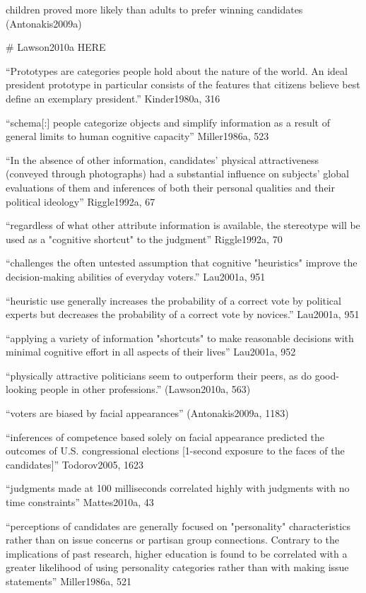 	children proved more likely than adults to prefer winning candidates (Antonakis2009a)

# Lawson2010a HERE

``Prototypes are categories people hold about the nature of the world. An ideal president prototype in particular consists of the features that citizens believe best define an exemplary president.'' Kinder1980a, 316

``schema[:] people categorize objects and simplify information as a result of general limits to human cognitive capacity'' Miller1986a, 523

``In the absence of other information, candidates' physical attractiveness (conveyed through photographs) had a substantial influence on subjects' global evaluations of them and inferences of both their personal qualities and their political ideology'' Riggle1992a, 67

``regardless of what other attribute information is available, the stereotype will be used as a "cognitive shortcut" to the judgment'' Riggle1992a, 70

``challenges the often untested assumption that cognitive "heuristics" improve the decision-making abilities of everyday voters.'' Lau2001a, 951

``heuristic use generally increases the probability of a correct vote by political experts but decreases the probability of a correct vote by novices.'' Lau2001a, 951

``applying a variety of information "shortcuts" to make reasonable decisions with minimal cognitive effort in all aspects of their lives'' Lau2001a, 952


``physically attractive politicians seem to outperform their peers, as do good-looking people in other professions.'' (Lawson2010a, 563)

``voters are biased by facial appearances'' (Antonakis2009a, 1183)


	
	``inferences of competence based solely on facial appearance predicted the outcomes of U.S. congressional elections [1-second exposure to the faces of the candidates]'' Todorov2005, 1623

	``judgments made at 100 milliseconds correlated highly with judgments with no time constraints'' Mattes2010a, 43

``perceptions of candidates are generally focused on "personality" characteristics rather than on issue concerns or partisan group connections. Contrary to the implications of past research, higher education is found to be correlated with a greater likelihood of using personality categories rather than with making issue statements'' Miller1986a, 521

